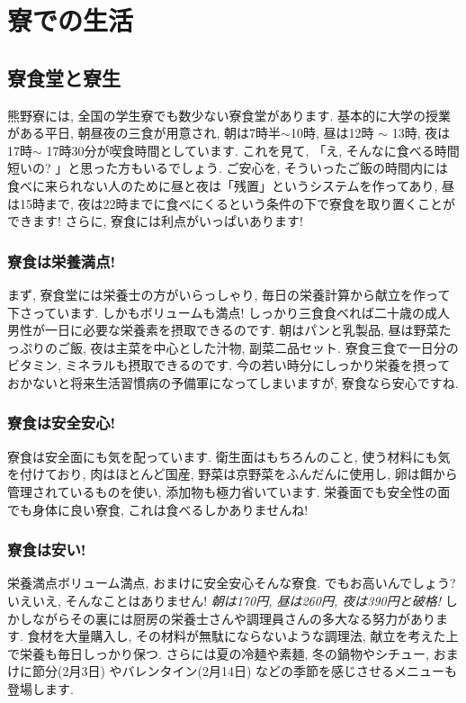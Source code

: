 \documentclass[10pt,b5jsbook,dvips,dvipdfmx,openany]{jsbook}
\theoremstyle{definition}
\begin{document}
\chapter{寮での生活} %

	\section{寮食堂と寮生}	\label{sec:cafeteria}
 	熊野寮には, 全国の学生寮でも数少ない寮食堂があります. 基本的に大学の授業がある平日, 朝昼夜の三食が用意され, 朝は7時半$\sim$10時, 昼は12時 $ \sim $ 13時, 夜は17時$ \sim $ 17時30分が喫食時間としています. これを見て, 「え, そんなに食べる時間短いの? 」と思った方もいるでしょう. ご安心を, そういったご飯の時間内には食べに来られない人のために昼と夜は「残置」というシステムを作ってあり, 昼は15時まで, 夜は22時までに食べにくるという条件の下で寮食を取り置くことができます! さらに, 寮食には利点がいっぱいあります!

		\subsection{寮食は栄養満点! }
 		まず, 寮食堂には栄養士の方がいらっしゃり, 毎日の栄養計算から献立を作って下さっています. しかもボリュームも満点! しっかり三食食べれば二十歳の成人男性が一日に必要な栄養素を摂取できるのです. 朝はパンと乳製品, 昼は野菜たっぷりのご飯, 夜は主菜を中心とした汁物, 副菜二品セット. 寮食三食で一日分のビタミン, ミネラルも摂取できるのです. 今の若い時分にしっかり栄養を摂っておかないと将来生活習慣病の予備軍になってしまいますが, 寮食なら安心ですね.

		\subsection{寮食は安全安心! }
寮食は安全面にも気を配っています. 衛生面はもちろんのこと, 使う材料にも気を付けており, 肉はほとんど国産, 野菜は京野菜をふんだんに使用し, 卵は餌から管理されているものを使い, 添加物も極力省いています. 栄養面でも安全性の面でも身体に良い寮食, これは食べるしかありませんね!

		\subsection{寮食は安い!}

		栄養満点ボリューム満点, おまけに安全安心そんな寮食. でもお高いんでしょう? いえいえ, そんなことはありません! \emph{朝は170円, 昼は260円, 夜は390円と破格! }しかしながらその裏には厨房の栄養士さんや調理員さんの多大なる努力があります. 食材を大量購入し, その材料が無駄にならないような調理法, 献立を考えた上で栄養も毎日しっかり保つ. さらには夏の冷麺や素麺, 冬の鍋物やシチュー, おまけに節分(2月3日) やバレンタイン(2月14日) などの季節を感じさせるメニューも登場します.
\end{document}
